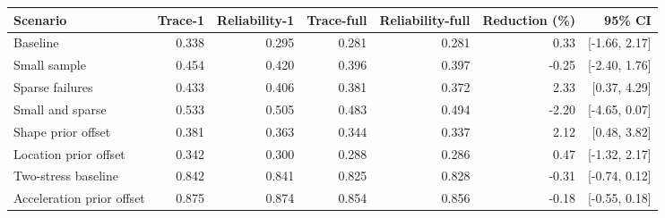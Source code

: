 \begin{tabular}{lrrrrrr}
\toprule
Scenario & Trace-1 & Reliability-1 & Trace-full & Reliability-full & Reduction (\%) & 95\% CI \\
\midrule
Baseline & 0.338 & 0.295 & 0.281 & 0.281 & 0.33 & [-1.66, 2.17] \\
Small sample & 0.454 & 0.420 & 0.396 & 0.397 & -0.25 & [-2.40, 1.76] \\
Sparse failures & 0.433 & 0.406 & 0.381 & 0.372 & 2.33 & [0.37, 4.29] \\
Small and sparse & 0.533 & 0.505 & 0.483 & 0.494 & -2.20 & [-4.65, 0.07] \\
Shape prior offset & 0.381 & 0.363 & 0.344 & 0.337 & 2.12 & [0.48, 3.82] \\
Location prior offset & 0.342 & 0.300 & 0.288 & 0.286 & 0.47 & [-1.32, 2.17] \\
Two-stress baseline & 0.842 & 0.841 & 0.825 & 0.828 & -0.31 & [-0.74, 0.12] \\
Acceleration prior offset & 0.875 & 0.874 & 0.854 & 0.856 & -0.18 & [-0.55, 0.18] \\
\bottomrule
\end{tabular}
